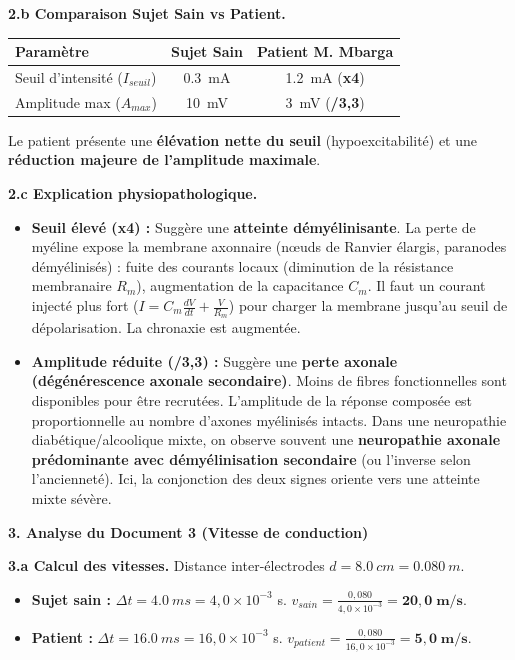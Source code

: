 \documentclass[11pt]{article}
\begin{document}
\begin{exoresolu}
\textbf{2.b Comparaison Sujet Sain vs Patient.}
\begin{center}
\begin{tabular}{|l|c|c|}\hline
\textbf{Paramètre} & \textbf{Sujet Sain} & \textbf{Patient M. Mbarga} \\ \hline
Seuil d'intensité ($I_{seuil}$) & \SI{0,3}{mA} & \SI{1,2}{mA} (\textbf{x4}) \\ \hline
Amplitude max ($A_{max}$) & \SI{10}{mV} & \SI{3}{mV} (\textbf{/3,3}) \\ \hline
\end{tabular}
\end{center}
Le patient présente une \textbf{élévation nette du seuil} (hypoexcitabilité) et une \textbf{réduction majeure de l'amplitude maximale}.

\textbf{2.c Explication physiopathologique.}
\begin{itemize}
    \item \textbf{Seuil élevé (x4) :} Suggère une \textbf{atteinte démyélinisante}. La perte de myéline expose la membrane axonnaire (nœuds de Ranvier élargis, paranodes démyélinisés) : fuite des courants locaux (diminution de la résistance membranaire $R_m$), augmentation de la capacitance $C_m$. Il faut un courant injecté plus fort ($I = C_m \frac{dV}{dt} + \frac{V}{R_m}$) pour charger la membrane jusqu'au seuil de dépolarisation. La chronaxie est augmentée.
    \item \textbf{Amplitude réduite (/3,3) :} Suggère une \textbf{perte axonale (dégénérescence axonale secondaire)}. Moins de fibres fonctionnelles sont disponibles pour être recrutées. L'amplitude de la réponse composée est proportionnelle au nombre d'axones myélinisés intacts. Dans une neuropathie diabétique/alcoolique mixte, on observe souvent une \textbf{neuropathie axonale prédominante avec démyélinisation secondaire} (ou l'inverse selon l'ancienneté). Ici, la conjonction des deux signes oriente vers une atteinte mixte sévère.
\end{itemize}

\textbf{3. Analyse du Document 3 (Vitesse de conduction)}

\textbf{3.a Calcul des vitesses.}
Distance inter-électrodes $d = \SI{8,0}{cm} = \SI{0,080}{m}$.
\begin{itemize}
    \item \textbf{Sujet sain :} $\Delta t = \SI{4,0}{ms} = 4,0 \times 10^{-3}$ s.
    $v_{sain} = \frac{0,080}{4,0 \times 10^{-3}} = \mathbf{20,0\; m/s}$.
    \item \textbf{Patient :} $\Delta t = \SI{16,0}{ms} = 16,0 \times 10^{-3}$ s.
    $v_{patient} = \frac{0,080}{16,0 \times 10^{-3}} = \mathbf{5,0\; m/s}$.
\end{itemize}


\end{exoresolu}
\end{document}
